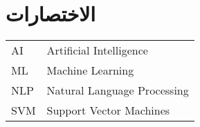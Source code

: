 

\chapter*{الاختصارات}

\begin{doublespacing}
	\begin{center}
		\begin{english}
			\begin{tabular}{l l}
				
				\indent
				AI		&		Artificial Intelligence \\
				
				\indent
				ML		&		Machine Learning \\
				
				\indent
				NLP		&		Natural Language Processing \\
				
				\indent
				SVM		&		Support Vector Machines \\
				
			\end{tabular}
		\end{english}
	\end{center}
\end{doublespacing}


